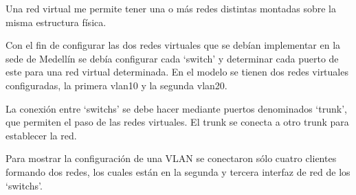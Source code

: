 Una red virtual me permite tener una o más redes distintas montadas sobre la misma estructura física.

Con el fin de configurar las dos redes virtuales que se debían implementar en la sede de Medellín se
debía configurar cada `switch' y determinar cada puerto de este para una red virtual determinada.
En el modelo se tienen dos redes virtuales configuradas, la primera vlan10 y la segunda vlan20.

La conexión entre `switchs' se debe hacer mediante puertos denominados `trunk', que permiten el
paso de las redes virtuales. El trunk se conecta a otro trunk para establecer la red.

Para mostrar la configuración de una VLAN se conectaron sólo cuatro clientes formando dos redes, los cuales están en la
segunda y tercera interfaz de red de los `switchs'.
